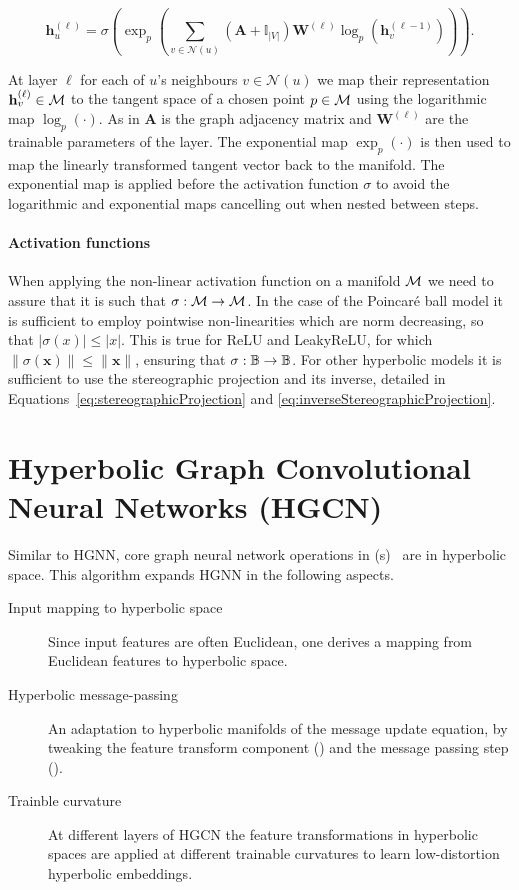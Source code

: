\begin{equation}\label{eq:HGNNgraphlevel}
    \mathbf{h}^{(\ell)}_u = \sigma\left(\exp_p\left(\sum_{v\in\mathcal{N}(u)}\left(\mathbf{A} + \mathbb{I}_{|V|}\right)\mathbf{W}^{(\ell)}\log_p\left(\mathbf{h}^{(\ell-1)}_v\right)\right)\right).
\end{equation}

At layer $\ell$ for each of $u$'s neighbours $v\in\mathcal{N}(u)$ we map their representation $\mathbf{h}^{(\ell)}_v\in \mathcal{M}$ to the tangent space of a chosen point $p\in \mathcal{M}$ using the logarithmic map $\log_p(\cdot)$. As in  $\mathbf{A}$ is the graph adjacency matrix and $\mathbf{W}^{(\ell)}$ are the trainable parameters of the layer. The exponential map $\exp_p(\cdot)$ is then used to map the linearly transformed tangent vector back to the manifold. The exponential map is applied before the activation function $\sigma$ to avoid the logarithmic and exponential maps cancelling out when nested between steps. 

\paragraph{Activation functions}
When applying the non-linear activation function on a manifold $\mathcal{M}$ we need to assure that it is  such that $\sigma: \mathcal{M}\to\mathcal{M}$. In the case of the Poincaré ball model it is sufficient to employ pointwise non-linearities which are norm decreasing, so that $|\sigma(x)|\leq |x|$. This is true for ReLU and LeakyReLU, for which $\|\sigma(\mathbf{x})\|\leq \|\mathbf{x}\|$, ensuring that $\sigma: \mathbb{B}\to \mathbb{B}$. For other hyperbolic models it is sufficient to use the stereographic projection and its inverse, detailed in Equations~\eqref{eq:stereographicProjection} and \eqref{eq:inverseStereographicProjection}.

\section{Hyperbolic Graph Convolutional Neural Networks (HGCN)}
Similar to HGNN, core graph neural network operations in  (s)~\cite{chami2019HGCN} are in hyperbolic space. This algorithm expands HGNN in the following aspects.

\begin{description}
    \item[Input mapping to hyperbolic space] Since input features are often Euclidean, one derives a mapping from Euclidean features to hyperbolic space.
    \item[Hyperbolic message-passing] An adaptation to hyperbolic manifolds of the message update equation, by tweaking the feature transform component () and the message passing step ().
    \item[Trainble curvature] At different layers of HGCN the feature transformations in hyperbolic spaces are applied at different trainable curvatures to learn low-distortion hyperbolic embeddings.
\end{description}

